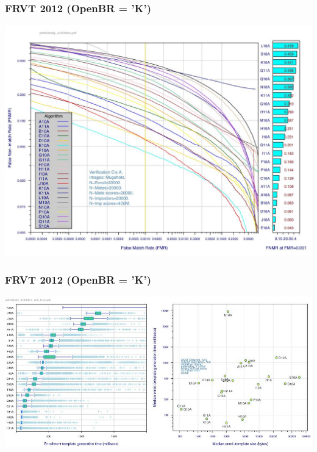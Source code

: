 \documentclass[12pt]{beamer}
\begin{document}
\begin{frame}
\frametitle{FRVT 2012 (OpenBR = 'K')}
\centering
\includegraphics[height=0.85\textheight]{img/frvt2012a}
\end{frame}

\begin{frame}
\frametitle{FRVT 2012 (OpenBR = 'K')}
\includegraphics[width=\textwidth]{img/frvt2012b}
\end{frame}
\end{document}
